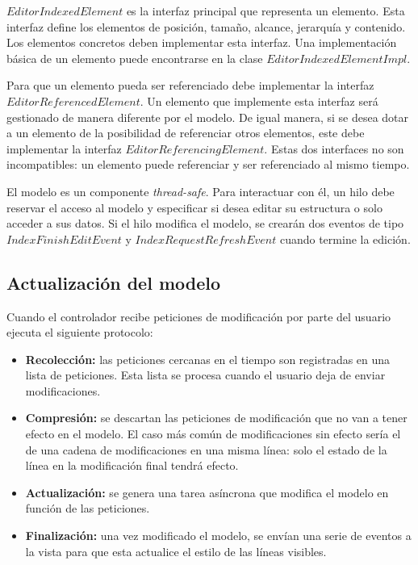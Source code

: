 $EditorIndexedElement$ es la interfaz principal
que representa un elemento.
Esta interfaz define los elementos de posición, tamaño, alcance,
jerarquía y contenido.
Los elementos concretos deben implementar esta interfaz.
Una implementación básica de un elemento puede encontrarse
en la clase $EditorIndexedElementImpl$.

Para que un elemento pueda ser referenciado debe
implementar la interfaz $EditorReferencedElement$.
Un elemento que implemente esta interfaz será gestionado
de manera diferente por el modelo.
De igual manera, si se desea dotar a un elemento de la
posibilidad de referenciar otros elementos,
este debe implementar la interfaz $EditorReferencingElement$.
Estas dos interfaces no son incompatibles:
un elemento puede referenciar y ser referenciado
al mismo tiempo.

El modelo es un componente \textit{thread-safe}.
Para interactuar con él, un hilo debe reservar el acceso
al modelo y especificar si desea editar su estructura o
solo acceder a sus datos.
Si el hilo modifica el modelo, se crearán dos eventos de tipo
$IndexFinishEditEvent$ y $IndexRequestRefreshEvent$
cuando termine la edición.

\subsection{Actualización del modelo}\label{subsec:actualizacion-del-modelo}

Cuando el controlador recibe peticiones de modificación
por parte del usuario ejecuta el siguiente protocolo:
\begin{itemize}
    \item \textbf{Recolección:} las peticiones cercanas
    en el tiempo son registradas en una lista de peticiones.
    Esta lista se procesa cuando el usuario deja
    de enviar modificaciones.
    \item \textbf{Compresión:} se descartan las peticiones
    de modificación que no van a tener efecto en el modelo.
    El caso más común de modificaciones sin efecto sería
    el de una cadena de modificaciones en una misma línea:
    solo el estado de la línea en la modificación final
    tendrá efecto.
    \item \textbf{Actualización:} se genera una tarea
    asíncrona que modifica el modelo en función de las
    peticiones.
    \item \textbf{Finalización:} una vez modificado el modelo,
    se envían una serie de eventos
    a la vista para que esta actualice el estilo
    de las líneas visibles.
\end{itemize}

